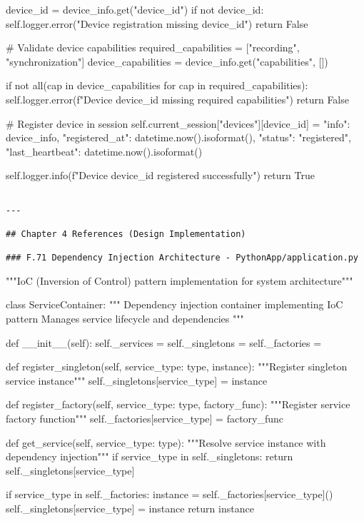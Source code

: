 \documentclass[11pt,a4paper]{report}
\begin{document}
    device\_id = device\_info.get("device\_id")
    if not device\_id:
        self.logger.error("Device registration missing device\_id")
        return False

    \# Validate device capabilities
    required\_capabilities = ["recording", "synchronization"]
    device\_capabilities = device\_info.get("capabilities", [])

    if not all(cap in device\_capabilities for cap in required\_capabilities):
        self.logger.error(f"Device {device\_id} missing required capabilities")
        return False

    \# Register device in session
    self.current\_session["devices"][device\_id] = {
        "info": device\_info,
        "registered\_at": datetime.now().isoformat(),
        "status": "registered",
        "last\_heartbeat": datetime.now().isoformat()
    }

    self.logger.info(f"Device {device\_id} registered successfully")
    return True
\begin{verbatim}

---

## Chapter 4 References (Design Implementation)

### F.71 Dependency Injection Architecture - PythonApp/application.py

\end{verbatim}
"""IoC (Inversion of Control) pattern implementation for system architecture"""


class ServiceContainer:
    """
    Dependency injection container implementing IoC pattern
    Manages service lifecycle and dependencies
    """

    def \_\_init\_\_(self):
        self.\_services = {}
        self.\_singletons = {}
        self.\_factories = {}

    def register\_singleton(self, service\_type: type, instance):
        """Register singleton service instance"""
        self.\_singletons[service\_type] = instance

    def register\_factory(self, service\_type: type, factory\_func):
        """Register service factory function"""
        self.\_factories[service\_type] = factory\_func

    def get\_service(self, service\_type: type):
        """Resolve service instance with dependency injection"""
        if service\_type in self.\_singletons:
            return self.\_singletons[service\_type]

        if service\_type in self.\_factories:
            instance = self.\_factories[service\_type]()
            self.\_singletons[service\_type] = instance
            return instance
\end{document}
